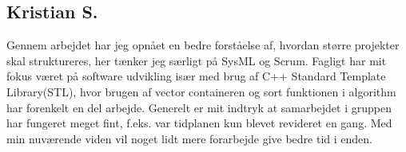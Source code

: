 \subsection{Kristian S.}

Gennem arbejdet har jeg opnået en bedre forståelse af, hvordan større projekter skal struktureres, her tænker jeg særligt på SysML og Scrum. Fagligt har mit fokus været på software udvikling især med brug af C++ Standard Template Library(STL), hvor brugen af vector containeren og sort funktionen i algorithm har forenkelt en del arbejde. Generelt er mit indtryk at samarbejdet i gruppen har fungeret meget fint, f.eks. var tidplanen kun blevet revideret en gang. Med min nuværende viden vil noget lidt mere forarbejde give bedre tid i enden.